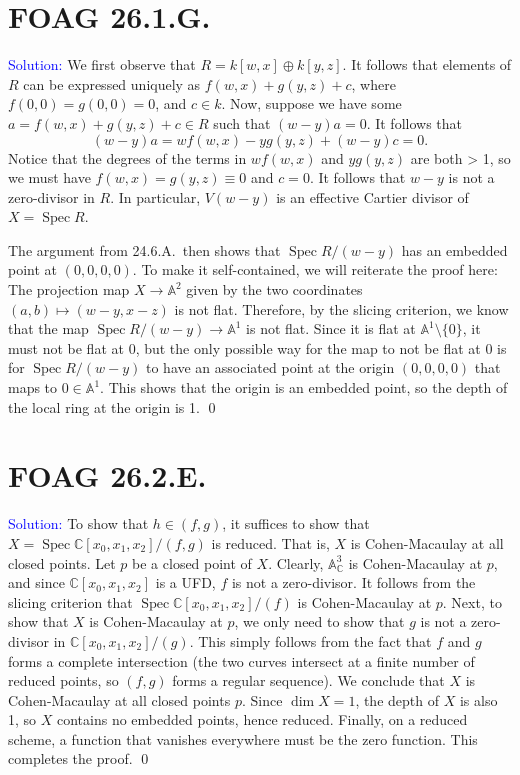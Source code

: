 \documentclass[11pt]{article}
\renewcommand{\AA}{\mathbb{A}}
\newcommand{\CC}{\mathbb{C}}
\DeclareMathOperator{\Spec}{\operatorname{Spec}}
\newenvironment{solution}{\begin{trivlist}\item[]{\textcolor{blue}{Solution:}}}{\qed \end{trivlist}}
\begin{document}
\section*{FOAG 26.1.G.}

\begin{solution}
    We first observe that $R = k[w,x] \oplus k[y,z]$. It follows that elements of $R$ can be expressed uniquely as $f(w,x) + g(y,z) + c$, where $f(0,0) = g(0,0) = 0$, and $c \in k$. Now, suppose we have some $a = f(w,x) + g(y,z) + c \in R$ such that $(w - y) a = 0$. It follows that 
    \[
        (w - y) a 
        = w f(w , x) - y g (y, z) + (w - y)c = 0.
    \]
    Notice that the degrees of the terms in $wf(w,x)$ and $yg(y,z)$ are both > 1, so we must have $f(w,x) = g(y,z) \equiv 0$ and $c = 0$. It follows that $w - y$ is not a zero-divisor in $R$. In particular, $V(w-y)$ is an effective Cartier divisor of $X = \Spec R$. 

    The argument from 24.6.A.\ then shows that $\Spec R/(w-y)$ has an embedded point at $(0,0,0,0)$. To make it self-contained, we will reiterate the proof here: The projection map $X \rightarrow \AA^2$ given by the two coordinates $(a,b) \mapsto (w - y, x - z)$ is not flat. Therefore, by the slicing criterion, we know that the map $\Spec R / (w - y) \rightarrow \AA^1$ is not flat. Since it is flat at $\AA^1 \setminus \{0\}$, it must not be flat at $0$, but the only possible way for the map to not be flat at 0 is for $\Spec R/(w-y)$ to have an associated point at the origin $(0,0,0,0)$ that maps to $0 \in \AA^1$. This shows that the origin is an embedded point, so the depth of the local ring at the origin is 1. 
\end{solution}

\newpage

\section*{FOAG 26.2.E.}

\begin{solution}
    To show that $h \in (f,g)$, it suffices to show that $X = \Spec \CC[x_0, x_1, x_2] / (f, g)$ is reduced. That is, $X$ is Cohen-Macaulay at all closed points. Let $p$ be a closed point of $X$. Clearly, $\AA_{\CC}^3$ is Cohen-Macaulay at $p$, and since $\CC[x_0, x_1, x_2]$ is a UFD, $f$ is not a zero-divisor. It follows from the slicing criterion that $\Spec \CC[x_0, x_1, x_2] / (f)$ is Cohen-Macaulay at $p$. Next, to show that $X$ is Cohen-Macaulay at $p$, we only need to show that $g$ is not a zero-divisor in $\CC[x_0, x_1, x_2] / (g)$. This simply follows from the fact that $f$ and $g$ forms a complete intersection (the two curves intersect at a finite number of reduced points, so $(f,g)$ forms a regular sequence). We conclude that $X$ is Cohen-Macaulay at all closed points $p$. Since $\dim X = 1$, the depth of $X$ is also 1, so $X$ contains no embedded points, hence reduced. Finally, on a reduced scheme, a function that vanishes everywhere must be the zero function. This completes the proof. 
\end{solution}
\end{document}
